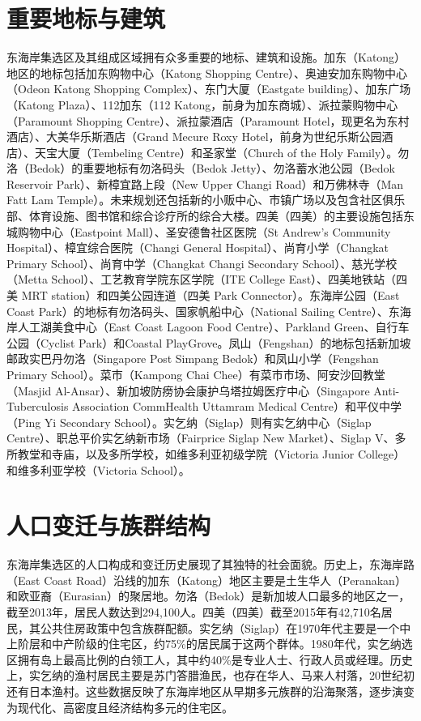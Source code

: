 \documentclass[11pt,a4paper,twoside,openany]{book}
\begin{document}
\section{重要地标与建筑}
东海岸集选区及其组成区域拥有众多重要的地标、建筑和设施。加东（Katong）地区的地标包括加东购物中心（Katong Shopping Centre）、奥迪安加东购物中心（Odeon Katong Shopping Complex）、东门大厦（Eastgate building）、加东广场（Katong Plaza）、112加东（112 Katong，前身为加东商城）、派拉蒙购物中心（Paramount Shopping Centre）、派拉蒙酒店（Paramount Hotel，现更名为东村酒店）、大美华乐斯酒店（Grand Mecure Roxy Hotel，前身为世纪乐斯公园酒店）、天宝大厦（Tembeling Centre）和圣家堂（Church of the Holy Family）。勿洛（Bedok）的重要地标有勿洛码头（Bedok Jetty）、勿洛蓄水池公园（Bedok Reservoir Park）、新樟宜路上段（New Upper Changi Road）和万佛林寺（Man Fatt Lam Temple）。未来规划还包括新的小贩中心、市镇广场以及包含社区俱乐部、体育设施、图书馆和综合诊疗所的综合大楼。四美（四美）的主要设施包括东城购物中心（Eastpoint Mall）、圣安德鲁社区医院（St Andrew’s Community Hospital）、樟宜综合医院（Changi General Hospital）、尚育小学（Changkat Primary School）、尚育中学（Changkat Changi Secondary School）、慈光学校（Metta School）、工艺教育学院东区学院（ITE College East）、四美地铁站（四美 MRT station）和四美公园连道（四美 Park Connector）。东海岸公园（East Coast Park）的地标有勿洛码头、国家帆船中心（National Sailing Centre）、东海岸人工湖美食中心（East Coast Lagoon Food Centre）、Parkland Green、自行车公园（Cyclist Park）和Coastal PlayGrove。凤山（Fengshan）的地标包括新加坡邮政实巴丹勿洛（Singapore Post Simpang Bedok）和凤山小学（Fengshan Primary School）。菜市（Kampong Chai Chee）有菜市市场、阿安沙回教堂（Masjid Al-Ansar）、新加坡防痨协会康护乌塔拉姆医疗中心（Singapore Anti-Tuberculosis Association CommHealth Uttamram Medical Centre）和平仪中学（Ping Yi Secondary School）。实乞纳（Siglap）则有实乞纳中心（Siglap Centre）、职总平价实乞纳新市场（Fairprice Siglap New Market）、Siglap V、多所教堂和寺庙，以及多所学校，如维多利亚初级学院（Victoria Junior College）和维多利亚学校（Victoria School）。

\section{人口变迁与族群结构}
东海岸集选区的人口构成和变迁历史展现了其独特的社会面貌。历史上，东海岸路（East Coast Road）沿线的加东（Katong）地区主要是土生华人（Peranakan）和欧亚裔（Eurasian）的聚居地。勿洛（Bedok）是新加坡人口最多的地区之一，截至2013年，居民人数达到294,100人。四美（四美）截至2015年有42,710名居民，其公共住房政策中包含族群配额。实乞纳（Siglap）在1970年代主要是一个中上阶层和中产阶级的住宅区，约75\%的居民属于这两个群体。1980年代，实乞纳选区拥有岛上最高比例的白领工人，其中约40\%是专业人士、行政人员或经理。历史上，实乞纳的渔村居民主要是苏门答腊渔民，也存在华人、马来人村落，20世纪初还有日本渔村。这些数据反映了东海岸地区从早期多元族群的沿海聚落，逐步演变为现代化、高密度且经济结构多元的住宅区。
\end{document}

